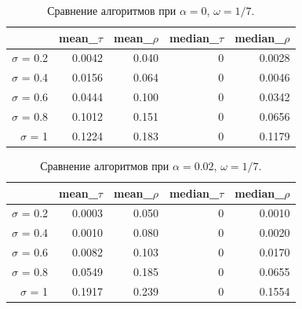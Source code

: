 \documentclass[specialist,
               substylefile = spbu.rtx,
               subf,href,colorlinks=true, 12pt]{disser}
\begin{document}
\begin{table}[hhh!]
\centering
\caption{Сравнение алгоритмов при $\alpha = 0$, $\omega = 1/7$.}
\begin{tabular}{rrrrr}
  \hline
 & mean\_$\tau$ & mean\_$\rho$ & median\_$\tau$ & median\_$\rho$ \\
  \hline
$\sigma$ = 0.2 & 0.0042 & 0.040 & 0 & 0.0028 \\ 
  $\sigma$ = 0.4 & 0.0156 & 0.064 & 0 & 0.0046 \\ 
  $\sigma$ = 0.6 & 0.0444 & 0.100 & 0 & 0.0342 \\ 
  $\sigma$ = 0.8 & 0.1012 & 0.151 & 0 & 0.0656 \\ 
  $\sigma$ = 1 & 0.1224 & 0.183 & 0 & 0.1179 \\ 
   \hline
\end{tabular}
\label{tab:comp_tau1_pgram}
\end{table}

\begin{table}[hhh!]
\centering
\caption{Сравнение алгоритмов при $\alpha = 0.02$, $\omega = 1/7$.}
\begin{tabular}{rrrrr}
  \hline
 & mean\_$\tau$ & mean\_$\rho$ & median\_$\tau$ & median\_$\rho$ \\
  \hline
$\sigma$ = 0.2 & 0.0003 & 0.050 & 0 & 0.0010 \\ 
  $\sigma$ = 0.4 & 0.0010 & 0.080 & 0 & 0.0020 \\ 
  $\sigma$ = 0.6 & 0.0082 & 0.103 & 0 & 0.0170 \\ 
  $\sigma$ = 0.8 & 0.0549 & 0.185 & 0 & 0.0655 \\ 
  $\sigma$ = 1 & 0.1917 & 0.239 & 0 & 0.1554 \\ 
   \hline
\end{tabular}
\label{tab:comp_tau1_pgram2}
\end{table}
\end{document}
